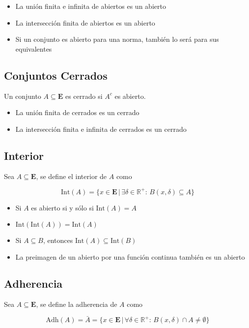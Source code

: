 \begin{itemize}
    \item La unión finita e infinita de abiertos es un abierto
    \item La intersección finita de abiertos es un abierto
    \item Si un conjunto es abierto para una norma, también lo será para sus equivalentes
\end{itemize}

\subsection{Conjuntos Cerrados}

Un conjunto $A\subseteq\mathbf{E}$ es cerrado si $A^c$ es abierto.

\begin{itemize}
    \item La unión finita de cerrados es un cerrado
    \item La intersección finita e infinita de cerrados es un cerrado
\end{itemize}

\subsection{Interior}

Sea $A\subseteq\mathbf{E}$, se define el interior de $A$ como

\[\mathrm{Int}(A) = \{x\in\mathbf{E}\,|\,
\exists\delta\in\mathbb{R}^+:\,B(x,\delta)\subseteq A\}\]

\begin{itemize}
    \item Si $A$ es abierto si y sólo si $\mathrm{Int}(A)=A$
    \item $\mathrm{Int}(\mathrm{Int}(A)) = \mathrm{Int}(A)$
    \item Si $A\subseteq B$, entonces $\mathrm{Int}(A)
    \subseteq \mathrm{Int}(B)$
    \item La preimagen de un abierto por una función continua también es un abierto
\end{itemize}

\subsection{Adherencia}

Sea $A\subseteq\mathbf{E}$, se define la adherencia de $A$ como

\[\mathrm{Adh}(A)= \bar{A} = \{x\in\mathbf{E}\,|\,
\forall\delta\in\mathbb{R}^+:\,B(x,\delta)\cap A\neq \emptyset\}\]

